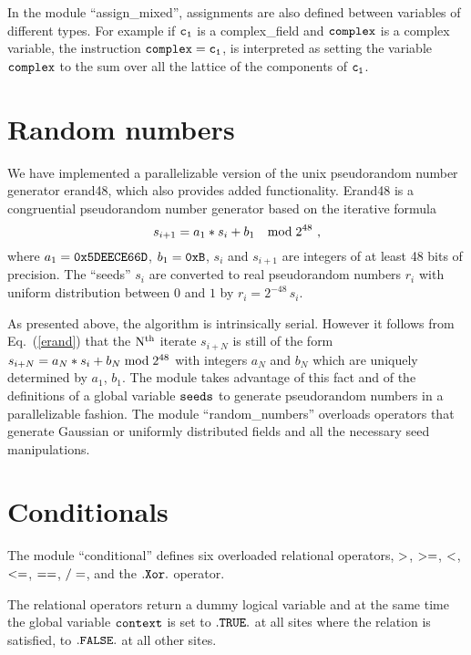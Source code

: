 In the module ``assign\_mixed'', assignments are also defined 
between variables of different types.
For example if $\tt c_1$ is a complex\_field and 
$\tt complex$ is a complex variable, the instruction
$\tt complex=c_1$, is interpreted as setting the variable 
$\tt complex$ to the sum over all the lattice of the 
components of $\tt c_1$.


\section{Random numbers}

We have implemented a parallelizable version of the unix pseudorandom
number generator erand48, which also provides added functionality.
Erand48 is a congruential pseudorandom number generator based 
on the iterative formula
%
\begin{equation}
s_{i+1}=a_1*s_i+b_1 \quad {\rm mod} \; 2^{48} \ ,
\label{erand}
\end{equation}
%
where $a_1=\tt 0x5DEECE66D$, $b_1=\tt 0xB$, $s_i$ 
and $s_{i+1}$ are integers of at least 48 bits of precision.  
The ``seeds'' $s_i$ are converted
to real pseudorandom numbers $r_i$ with uniform distribution 
between $0$ and $1$ by $r_i=2^{-48}\, s_i$.

As presented above, the algorithm is intrinsically serial. 
However it follows from Eq.~(\ref{erand}) that the 
$\rm N^{th}$ iterate $s_{i+N}$ is still of the form 
$s_{i+N}=a_N*s_i+b_N \; {\rm mod} \; 2^{48}$ with integers
$a_N$ and $b_N$ which are uniquely determined by $a_1$, $b_1$.
The module takes advantage of this fact and of the definitions of
a global variable $\tt seeds$ to generate 
pseudorandom numbers in a parallelizable fashion.  
The module ``random\_numbers'' overloads operators that generate
Gaussian or uniformly distributed fields and all the 
necessary seed manipulations.


\section{Conditionals}

The module ``conditional''
defines six overloaded relational operators, $\tt >$, $\tt >=$,
$\tt < $, $\tt <= $, $\tt == $, $\tt /=$, and the
$\tt .Xor.$ operator.

The relational operators return a dummy logical variable and
at the same time the global variable $\tt context$ is set to 
$\tt .TRUE.$ at all sites where the relation is satisfied, 
to $\tt .FALSE.$ at all other sites. 

